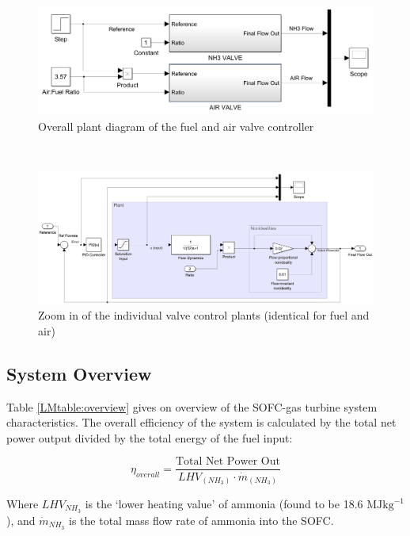 \documentclass{article}
\begin{document}
\begin{figure}[b!]
    \centering
    \includegraphics[scale=0.25]{controlleroverall.png}
    \caption{Overall plant diagram of the fuel and air valve controller}
    \label{LMfig:controller}
\end{figure}\\

\begin{landscape}
\begin{figure}[p]
    \centering
    \includegraphics[scale=0.8]{valvecontroller.png}
    \caption{Zoom in of the individual valve control plants (identical for fuel and air)}
    \label{LMfig:valveplant}
\end{figure}
\end{landscape}

\subsection{System Overview}
Table \ref{LMtable:overview} gives on overview of the SOFC-gas turbine system characteristics. The overall efficiency of the system is calculated by the total net power output divided by the total energy of the fuel input:

\begin{equation}
\eta_{overall}=  \frac{\text{Total Net Power Out}}{LHV_{(NH_{3})} \cdot \dot{m}_{(NH_3)}}		
\end{equation}

Where $LHV_{NH_3}$ is the `lower heating value' of ammonia (found to be 18.6 $\text{MJkg}^{-1}$ \cite{LM25}), and $\dot{m}_{NH_3}$ is the total mass flow rate of ammonia into the SOFC.
\end{document}
